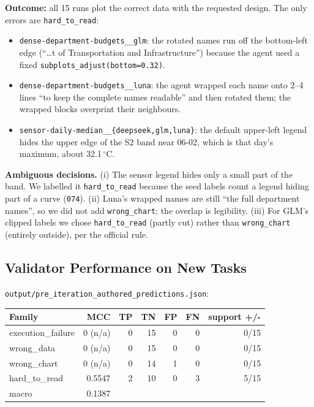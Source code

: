 \documentclass[11pt]{article}
\newcommand{\run}[1]{\texttt{#1}}
\begin{document}
\textbf{Outcome:} all 15 runs plot the correct data with the requested design.
The only errors are \texttt{hard\_to\_read}:
\begin{itemize}
\item \run{dense-department-budgets\_\_glm}: the rotated names run off the
bottom-left edge (``\ldots t of Transportation and Infrastructure'') because the
agent used a fixed \texttt{subplots\_adjust(bottom=0.32)}.
\item \run{dense-department-budgets\_\_luna}: the agent wrapped each name onto
2--4 lines ``to keep the complete names readable'' and then rotated them; the
wrapped blocks overprint their neighbours.
\item \run{sensor-daily-median\_\_\{deepseek,glm,luna\}}: the default upper-left
legend hides the upper edge of the S2 band near 06-02, which is that day's
maximum, about 32.1\,$^\circ$C.
\end{itemize}
\textbf{Ambiguous decisions.} (i) The sensor legend hides only a small part of
the band. We labelled it \texttt{hard\_to\_read} because the seed labels count a
legend hiding part of a curve (\run{074}). (ii) Luna's wrapped names are still
``the full department names'', so we did not add \texttt{wrong\_chart}; the
overlap is legibility. (iii) For GLM's clipped labels we chose
\texttt{hard\_to\_read} (partly cut) rather than \texttt{wrong\_chart}
(entirely outside), per the official rule.

\subsection{Validator Performance on New Tasks}
\texttt{output/pre\_iteration\_authored\_predictions.json}:

\begin{center}
\begin{tabular}{lrrrrrr}
\toprule
Family & MCC & TP & TN & FP & FN & support +/- \\
\midrule
execution\_failure & 0 (n/a) & 0 & 15 & 0 & 0 & 0/15 \\
wrong\_data & 0 (n/a) & 0 & 15 & 0 & 0 & 0/15 \\
wrong\_chart & 0 (n/a) & 0 & 14 & 1 & 0 & 0/15 \\
hard\_to\_read & 0.5547 & 2 & 10 & 0 & 3 & 5/15 \\
\midrule
macro & 0.1387 & & & & & \\
\bottomrule
\end{tabular}
\end{center}
\end{document}

